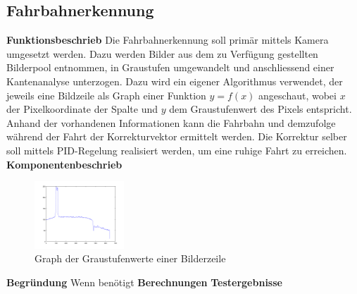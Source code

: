 \subsection{Fahrbahnerkennung}
\textbf{Funktionsbeschrieb}
Die Fahrbahnerkennung soll primär mittels Kamera umgesetzt werden. Dazu werden Bilder aus dem zu Verfügung gestellten Bilderpool entnommen, in Graustufen umgewandelt und anschliessend einer Kantenanalyse unterzogen. Dazu wird ein eigener Algorithmus verwendet, der jeweils eine Bildzeile als Graph einer Funktion $y = f(x)$ angeschaut, wobei $x$ der Pixelkoordinate der Spalte und $y$ dem Graustufenwert des Pixels entspricht.\\
Anhand der vorhandenen Informationen kann die Fahrbahn und demzufolge während der Fahrt der Korrekturvektor ermittelt werden. Die Korrektur selber soll mittels PID-Regelung realisiert werden, um eine ruhige Fahrt zu erreichen.
\textbf{Komponentenbeschrieb}
\begin{figure}[h!]%
\centering
\includegraphics[width=0.3\textwidth]{pictures/graphPicture.png}
\caption{Graph der Graustufenwerte einer Bilderzeile}
\label{fig:OpenCV}
\end{figure}
\textbf{Begründung}
Wenn benötigt
\textbf{Berechnungen}
\textbf{Testergebnisse}